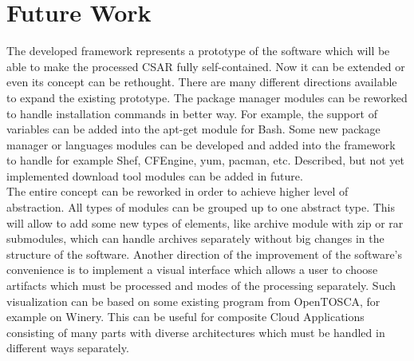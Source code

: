 \section*{Future Work}
The developed framework represents a prototype of the software which will be able to make the processed CSAR fully self-contained.
Now it can be extended or even its concept can be rethought.
There are many different directions available to expand the existing prototype.
The package manager modules can be reworked to handle installation commands in better way.
For example, the support of variables can be added into the apt-get module for Bash.
Some new package manager or languages modules can be developed and added into the framework to handle for example Shef, CFEngine, yum, pacman, etc.
Described, but not yet implemented download tool modules can be added in future.\\
The entire concept can be reworked in order to achieve higher level of abstraction.
All types of modules can be grouped up to one abstract type.
This will allow to add some new types of elements, like archive module with zip or rar submodules, which can handle archives separately without big changes in the structure of the software.
Another direction of the improvement of the software's convenience is to implement a visual interface which allows a user to choose artifacts which must be processed and modes of the processing separately.
Such visualization can be based on some existing program from OpenTOSCA, for example on Winery.
This can be useful for composite Cloud Applications consisting of many parts with diverse architectures which must be handled in different ways separately.
